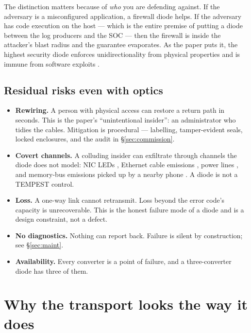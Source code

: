\documentclass[11pt,a4paper]{article}
\begin{document}
The distinction matters because of \emph{who} you are defending against. If
the adversary is a misconfigured application, a firewall diode helps. If the
adversary has code execution on the \srcside{} host --- which is the entire
premise of putting a diode between the log producers and the SOC --- then the
firewall is inside the attacker's blast radius and the guarantee evaporates.
As the paper puts it, the highest security diode enforces unidirectionality
from physical properties and is immune from software exploits
\cite{anton2024}.

\subsection{Residual risks even with optics}

\begin{itemize}
\item \textbf{Rewiring.} A person with physical access can restore a return
      path in seconds. This is the paper's ``unintentional insider'': an
      administrator who tidies the cables. Mitigation is procedural ---
      labelling, tamper-evident seals, locked enclosures, and the audit in
      \S\ref{sec:commission}.
\item \textbf{Covert channels.} A colluding insider can exfiltrate through
      channels the diode does not model: NIC LEDs \cite{etherled}, Ethernet
      cable emissions \cite{lantenna}, power lines \cite{powerhammer}, and
      memory-bus emissions picked up by a nearby phone \cite{gsmem}. A diode
      is not a TEMPEST control.
\item \textbf{Loss.} A one-way link cannot retransmit. Loss beyond the error
      code's capacity is unrecoverable. This is the honest failure mode of a
      diode and is a design constraint, not a defect.
\item \textbf{No diagnostics.} Nothing can report back. Failure is silent by
      construction; see \S\ref{sec:maint}.
\item \textbf{Availability.} Every converter is a point of failure, and a
      three-converter diode has three of them.
\end{itemize}

\section{Why the transport looks the way it does}
\end{document}
